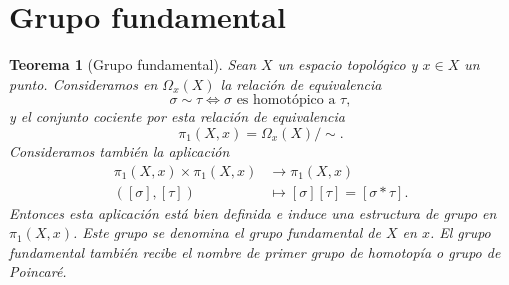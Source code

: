 \documentclass[12pt,a4paper]{book}
\newtheorem{thm}{Teorema}[section]
\theoremstyle{definition} \newtheorem{defn}[thm]{Definición}
\theoremstyle{definition} \newtheorem{ejemplo}[thm]{Ejemplo}
\theoremstyle{definition} \newtheorem{ejercicio}[thm]{Ejercicio}
\theoremstyle{remark} \newtheorem*{obs}{Observación}
\def\gf{\pi_1}
\begin{document}
\section{Grupo fundamental}
\begin{thm}[Grupo fundamental]
  Sean $X$ un espacio topológico y $x\in X$ un punto. Consideramos en $\Omega_x(X)$ la relación de equivalencia 
  \begin{equation*}
    \sigma \sim \tau \Leftrightarrow \sigma \text{ es homotópico a } \tau,
  \end{equation*}
y el conjunto cociente por esta relación de equivalencia
\begin{equation*}
  \pi_1(X,x)=\Omega_x(X)/\sim.
\end{equation*}
Consideramos también la aplicación 
\begin{align*}
   \pi_1(X,x)\times \pi_1(X,x)&\longrightarrow \pi_1(X,x)\\ 
   ([\sigma],[\tau]) &\longmapsto [\sigma][\tau]=[\sigma * \tau]. 
  \end{align*}
  Entonces esta aplicación está bien definida e induce una estructura de grupo en $\gf(X,x)$. Este grupo se denomina el \emph{grupo fundamental de $X$ en $x$}. El grupo fundamental también recibe el nombre de \emph{primer grupo de homotopía} o \emph{grupo de Poincaré}.
\end{thm}
\end{document}

